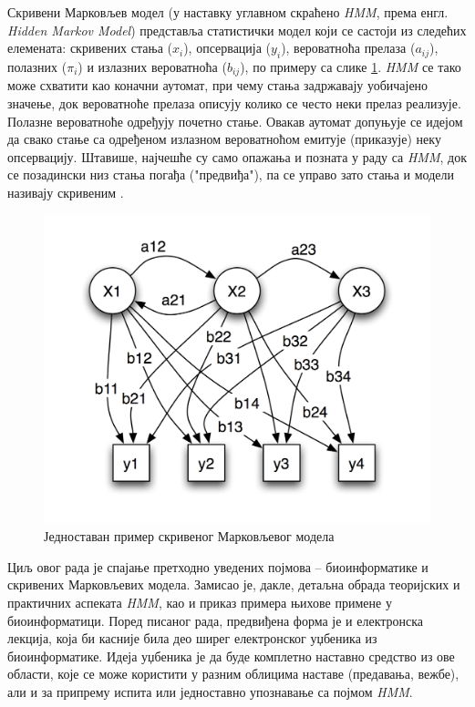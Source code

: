 \documentclass[12pt,oneside]{memoir}
\begin{document}
\begin{CJK}{UTF8}{ipxm}
Скривени Марковљев модел (у наставку углавном скраћено \textit{HMM}, према енгл. \textit{Hidden Markov Model}) представља статистички модел који се састоји из следећих елемената: скривених стања ($x_i$), опсервација ($y_i$), вероватноћа прелаза ($a_{ij}$), полазних ($\pi_i$) и излазних вероватноћа ($b_{ij}$), по примеру са слике \ref{fig:hmm}. \textit{HMM} се тако може схватити као коначни аутомат, при чему стања задржавају уобичајено значење, док вероватноће прелаза описују колико се често неки прелаз реализује. Полазне вероватноће одређују почетно стање. Овакав аутомат допуњује се идејом да свако стање са одређеном излазном вероватноћом емитује (приказује) неку опсервацију. Штавише, најчешће су само опажања и позната у раду са \textit{HMM}, док се позадински низ стања погађа ("предвиђа"), па се управо зато стања и модели називају скривеним \cite{rabiner1989}.

\begin{figure}[H]
  \centering
  \includegraphics[width=.71\textwidth]{hmm.png}
  \caption[]{Једноставан пример скривеног Марковљевог модела\footnotemark}
  \label{fig:hmm}
\end{figure}


Циљ овог рада је спајање претходно уведених појмова -- биоинформатике и скривених Марковљевих модела. Замисао је, дакле, детаљна обрада теоријских и практичних аспеката \textit{HMM}, као и приказ примера њихове примене у биоинформатици. Поред писаног рада, предвиђена форма је и електронска лекција, која би касније била део ширег електронског уџбеника из биоинформатике. Идеја уџбеника је да буде комплетно наставно средство из ове области, које се може користити у разним облицима наставе (предавања, вежбе), али и за припрему испита или једноставно упознавање са појмом \textit{HMM}. 


\end{CJK}
\end{document}
